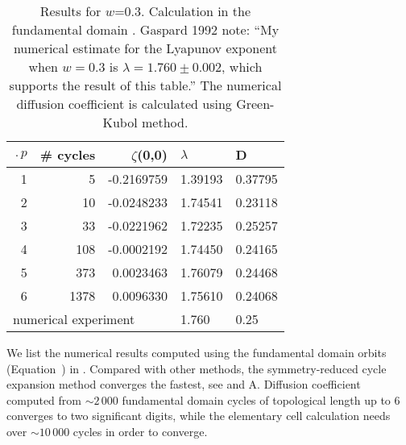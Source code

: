 \begin{table}[htbp]
	\centering
	\begin{tabular}{|r|r|r|l|l|}
		\hline
		$\period{p}$ & \# cycles & $\zeta$(0,0) & $\lambda$ & D \\ 
		\hline\hline
		1      & 5      & -0.2169759 & 1.39193 & 0.37795 \\
		2      & 10     & -0.0248233 & 1.74541 & 0.23118 \\
		3      & 33     & -0.0221962 & 1.72235 & 0.25257 \\
		4      & 108    & -0.0002192 & 1.74450 & 0.24165 \\
		5      & 373    &  0.0023463 & 1.76079 & 0.24468 \\
		6      & 1378   &  0.0096330 & 1.75610 & 0.24068 \\ 
		\hline\hline
		\multicolumn{3}{|l|}{numerical experiment}
		& 1.760   & 0.25
		\\ \hline
	\end{tabular}
	\caption[Fundamental domain cycle expansion results of diffusion 
	coefficient]{\label{TCELL2}
		Results for $w$=0.3. Calculation in the fundamental domain . 
		Gaspard 
		1992 note: ``My
		numerical estimate for the Lyapunov exponent when $w=0.3$ is
		$\lambda = 1.760 \pm 0.002$, which supports the result of this
		table.'' The numerical diffusion coefficient is calculated 
		using 
		Green-Kubol method. 
	}
\end{table}

We list the numerical results computed using the fundamental domain
orbits (Equation~) in . Compared with
other methods, the symmetry-reduced cycle expansion method converges
the fastest, see  and A. Diffusion
coefficient computed from $\sim2\,000$ fundamental domain cycles of
topological length up to 6 converges to two significant digits, while
the elementary cell calculation needs over $\sim 10\,000$ cycles in
order to converge.

